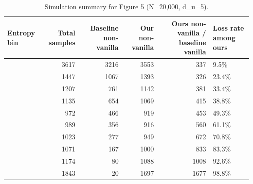 \begin{table}
\caption{Simulation summary for Figure 5 (N=20,000, d_u=5).}
\label{tab:figure5-summary}
\begin{tabular}{lrrrrl}
\toprule
Entropy bin & Total samples & Baseline non-vanilla & Our non-vanilla & Ours non-vanilla / baseline vanilla & Loss rate among ours \\
\midrule
[0.0,0.1] & 3617 & 3216 & 3553 & 337 & 9.5\% \\
[0.1,0.2] & 1447 & 1067 & 1393 & 326 & 23.4\% \\
[0.2,0.3] & 1207 & 761 & 1142 & 381 & 33.4\% \\
[0.3,0.4] & 1135 & 654 & 1069 & 415 & 38.8\% \\
[0.4,0.5] & 972 & 466 & 919 & 453 & 49.3\% \\
[0.5,0.6] & 989 & 356 & 916 & 560 & 61.1\% \\
[0.6,0.7] & 1023 & 277 & 949 & 672 & 70.8\% \\
[0.7,0.8] & 1071 & 167 & 1000 & 833 & 83.3\% \\
[0.8,0.9] & 1174 & 80 & 1088 & 1008 & 92.6\% \\
[0.9,1.0] & 1843 & 20 & 1697 & 1677 & 98.8\% \\
\bottomrule
\end{tabular}
\end{table}
